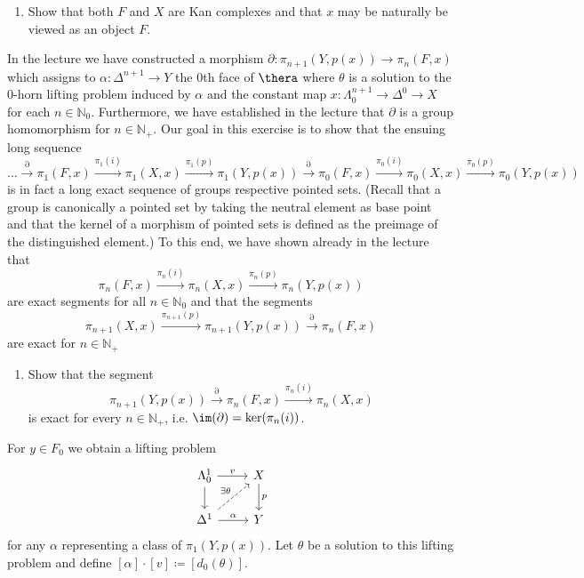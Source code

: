 \begin{enumerate}
    \item 
    Show that both $ F $ and $ X $ are Kan complexes and that $ x $ may be naturally be viewed as an object $ F $.
    
\end{enumerate}

In the lecture we have constructed a morphism $ \partial : \pi_{n+1} ( Y , p ( x ) ) \to \pi_n ( F , x ) $ which assigns to $\alpha : \Delta^{ n + 1 } \to Y $ the 0th face of $ \thera $ where $ \theta $ is a solution to the 0-horn lifting problem induced by $ \alpha $ and the constant map $ x : \Lambda_0^{n+1} \to \Delta^0 \to X $ for each $ n \in \mathbb{N}_0$.
Furthermore, we have established in the lecture that $\partial$ is a group homomorphism for $ n \in \mathbb{N}_+ $.
Our goal in this exercise is to show that the ensuing long sequence
\[
    \dotsc 
    \xrightarrow{\partial}
    \pi_1 ( F , x ) 
    \xrightarrow{\pi_1(i)}
    \pi_1 ( X , x )
    \xrightarrow{\pi_1 ( p )}
    \pi_1 ( Y , p ( x ) )
    \xrightarrow{\partial}
    \pi_0 ( F , x ) 
    \xrightarrow{\pi_0(i)}
    \pi_0(X,x)
    \xrightarrow{\pi_0(p)}
    \pi_0(Y,p(x))
\]
is in fact a long exact sequence of groups respective pointed sets.
(Recall that a group is canonically a pointed set by taking the neutral element as base point and that the kernel of a morphism of pointed sets is defined as the preimage of the distinguished element.) 
To this end, we have shown already in the lecture that 
\[
    \pi_n( F , x ) 
    \xrightarrow{\pi_n(i)}
    \pi_n ( X ,x ) 
    \xrightarrow{\pi_n ( p )}
    \pi_n( Y , p ( x )  )
\]
are exact segments for all $ n \in \mathbb{ N }_0 $ and that the segments
\[
    \pi_{n+1}( X , x )
    \xrightarrow{\pi_{n+1}(p)}
    \pi_{n+1} ( Y , p ( x ) ) 
    \xrightarrow{ \partial }
    \pi_n ( F , x )
\]
are exact for $ n \in \mathbb{N}_+ $

\begin{enumerate}[label=(\alph*), resume]
    \item 
    Show that the segment 
    \[
        \pi_{n+1} ( Y , p ( x ) ) 
        \xrightarrow{ \partial }
        \pi_n ( F , x )
        \xrightarrow{ \pi_n ( i ) }
        \pi_n ( X , x ) 
    \]
    is exact for every $ n \in \mathbb{ N }_+ $, i.e. $\im ( \partial ) = \ker ( \pi_n ( i ) ) $.
\end{enumerate}

For $ y \in F_0 $ we obtain a lifting problem
\[
\begin{tikzcd}
    \Lambda_0^1
    \ar[r, "v"]
    \ar[d]
    &
    X
    \ar[d, "p"]
    \\
    \Delta^1 
    \ar[ru, dashed, " \exists \theta "]
    \ar[r, " \alpha "]
    &
    Y
\end{tikzcd}
\]
for any $ \alpha $ representing a class of $ \pi_1 ( Y , p ( x ) ) $.
Let $ \theta $ be a solution to this lifting problem and define $ [ \alpha ] \cdot [ v ] \coloneqq [ d_0 ( \theta ) ]$.

